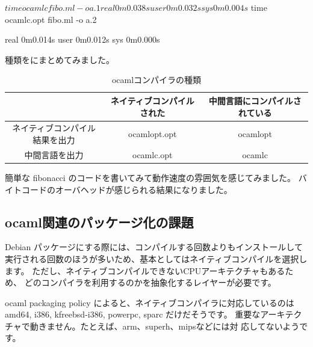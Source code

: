 \documentclass[mingoth,a4paper]{jsarticle}
\begin{document}
\begin{commandline}
$ time ocamlc fibo.ml -o a.1

real	0m0.038s
user	0m0.032s
sys	0m0.004s
$ time ocamlc.opt fibo.ml -o a.2

real	0m0.014s
user	0m0.012s
sys	0m0.000s
\end{commandline}

種類をにまとめてみました。

\begin{table}[h]
\caption{ocamlコンパイラの種類}
\label{typesofocamlcompilers}
 \begin{tabular}{|c|c|c|}
 \hline
 & ネイティブコンパイルされた & 中間言語にコンパイルされている\\
 \hline
 ネイティブコンパイル結果を出力 &
 ocamlopt.opt & ocamlopt\\
 \hline
 中間言語を出力 &
 ocamlc.opt & ocamlc \\
 \hline
 \end{tabular}
\end{table}


簡単な fibonacci のコードを書いてみて動作速度の雰囲気を感じてみました。
バイトコードのオーバヘッドが感じられる結果になりました。



\subsection{ocaml関連のパッケージ化の課題}

Debian パッケージにする際には、コンパイルする回数よりもインストールして
実行される回数のほうが多いため、基本としてはネイティブコンパイルを選択し
ます。
ただし、ネイティブコンパイルできないCPUアーキテクチャもあるため、
どのコンパイラを利用するのかを抽象化するレイヤーが必要です。

ocaml packaging policy によると、ネイティブコンパイラに対応しているのは
amd64, i386, kfreebsd-i386, powerpc, sparc だけだそうです。
重要なアーキテクチャで動きません。たとえば、arm、superh、mipsなどには対
応してないようです。
\end{document}
